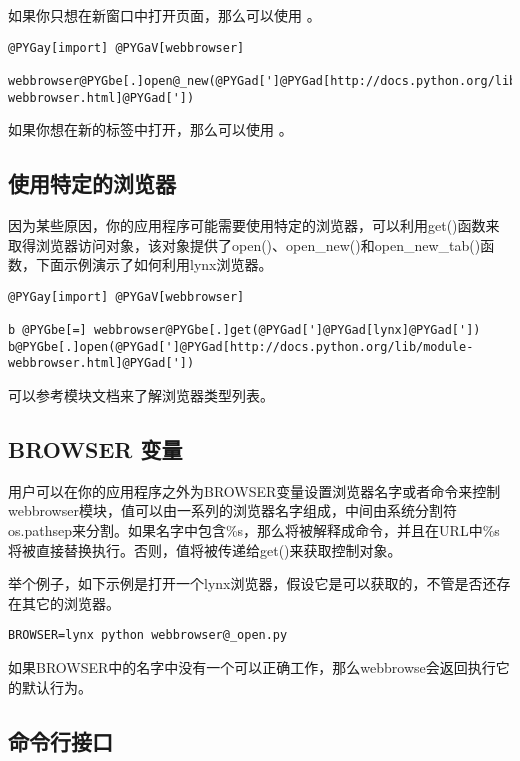 \documentclass[a4paper,10pt,english]{manual}
\begin{document}
如果你只想在新窗口中打开页面，那么可以使用  。

\begin{Verbatim}[commandchars=@\[\]]
@PYGay[import] @PYGaV[webbrowser]

webbrowser@PYGbe[.]open@_new(@PYGad[']@PYGad[http://docs.python.org/lib/module-webbrowser.html]@PYGad['])
\end{Verbatim}

如果你想在新的标签中打开，那么可以使用  。


\subsection{使用特定的浏览器}

因为某些原因，你的应用程序可能需要使用特定的浏览器，可以利用get()函数来取得浏览器访问对象，该对象提供了open()、open\_new()和open\_new\_tab()函数，下面示例演示了如何利用lynx浏览器。

\begin{Verbatim}[commandchars=@\[\]]
@PYGay[import] @PYGaV[webbrowser]

b @PYGbe[=] webbrowser@PYGbe[.]get(@PYGad[']@PYGad[lynx]@PYGad['])
b@PYGbe[.]open(@PYGad[']@PYGad[http://docs.python.org/lib/module-webbrowser.html]@PYGad['])
\end{Verbatim}

可以参考模块文档来了解浏览器类型列表。


\subsection{BROWSER 变量}

用户可以在你的应用程序之外为BROWSER变量设置浏览器名字或者命令来控制webbrowser模块，值可以由一系列的浏览器名字组成，中间由系统分割符os.pathsep来分割。如果名字中包含\%s，那么将被解释成命令，并且在URL中\%s将被直接替换执行。否则，值将被传递给get()来获取控制对象。

举个例子，如下示例是打开一个lynx浏览器，假设它是可以获取的，不管是否还存在其它的浏览器。

\begin{Verbatim}[commandchars=@\[\]]
BROWSER=lynx python webbrowser@_open.py
\end{Verbatim}

如果BROWSER中的名字中没有一个可以正确工作，那么webbrowse会返回执行它的默认行为。


\subsection{命令行接口}
\end{document}
